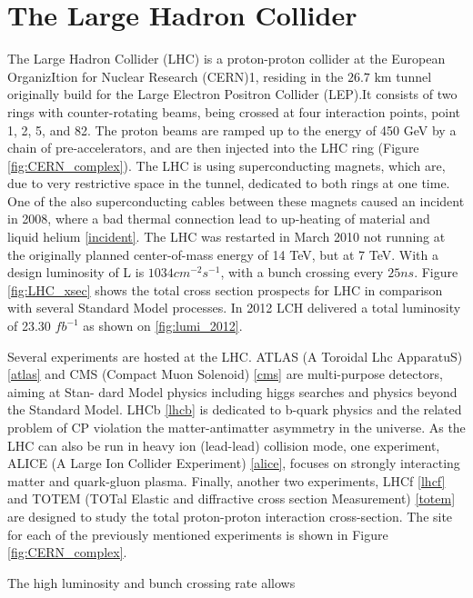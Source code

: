 

\section{The Large Hadron Collider}

The Large Hadron Collider (LHC) is a proton-proton collider at the European OrganizItion for Nuclear Research (CERN)1, residing in the $26.7$ km tunnel originally build for the Large Electron Positron Collider (LEP).It consists of two rings with counter-rotating beams, being crossed at four interaction points, point 1, 2, 5, and 82. The proton beams are ramped up to the energy of 450 GeV by a chain of pre-accelerators, and are then injected into the LHC ring (Figure \ref{fig:CERN_complex}). The LHC is using superconducting magnets, which are, due to very restrictive space in the tunnel, dedicated to both rings at one time. One of the also superconducting cables between these magnets caused an incident in 2008, where a bad thermal connection lead to up-heating of material and liquid helium \ref{incident}. The LHC was restarted in March 2010 not running at the originally planned center-of-mass energy of 14 TeV, but at 7 TeV. With a design luminosity of L is $1034 cm^{-2}s^{-1}$, with a bunch crossing every $25 ns$. Figure \ref{fig:LHC_xsec} shows the total cross section prospects for LHC in comparison with several Standard Model processes. In 2012 LCH delivered a total luminosity of 23.30 $fb^{-1}$ as shown on \ref{fig:lumi_2012}.

Several experiments are hosted at the LHC. ATLAS (A Toroidal Lhc ApparatuS) \ref{atlas} and CMS (Compact Muon Solenoid) \ref{cms} are multi-purpose detectors, aiming at Stan- dard Model physics including higgs searches and physics beyond the Standard Model. LHCb \ref{lhcb} is dedicated to b-quark physics and the related problem of CP violation the matter-antimatter asymmetry in the universe. As the LHC can also be run in heavy ion (lead-lead) collision mode, one experiment, ALICE (A Large Ion Collider Experiment) \ref{alice}, focuses on strongly interacting matter and quark-gluon plasma. Finally, another two experiments, LHCf \ref{lhcf} and TOTEM (TOTal Elastic and diffractive cross section Measurement) \ref{totem} are designed to study the total proton-proton interaction cross-section. The site for each of the previously mentioned experiments is shown in Figure \ref{fig:CERN_complex}.

The high luminosity and bunch crossing rate allows 


